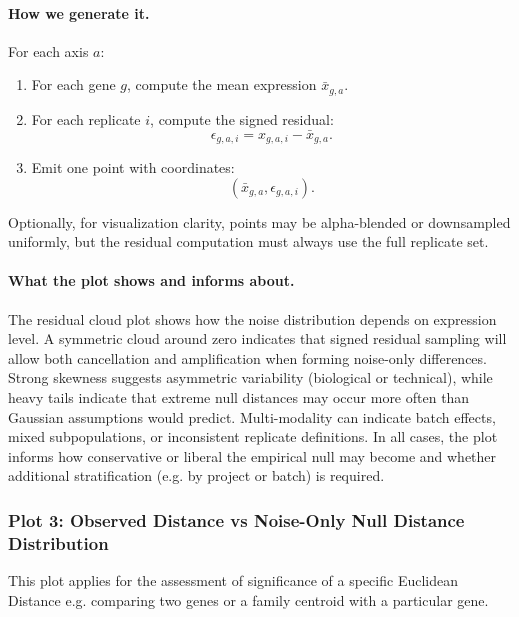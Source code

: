             \paragraph{How we generate it.}
            For each axis $a$:
            \begin{enumerate}
                \item For each gene $g$, compute the mean expression $\bar{x}_{g,a}$.
                \item For each replicate $i$, compute the signed residual:
                      \[
                          \epsilon_{g,a,i} = x_{g,a,i} - \bar{x}_{g,a}.
                      \]
                \item Emit one point with coordinates:
                      \[
                          (\bar{x}_{g,a}, \epsilon_{g,a,i}).
                      \]
            \end{enumerate}
            Optionally, for visualization clarity, points may be alpha-blended or downsampled uniformly, but the residual computation must always use the full replicate set.

            \paragraph{What the plot shows and informs about.}
            The residual cloud plot shows how the noise distribution depends on expression level. A symmetric cloud around zero indicates that signed residual sampling will allow both cancellation and amplification when forming noise-only differences. Strong skewness suggests asymmetric variability (biological or technical), while heavy tails indicate that extreme null distances may occur more often than Gaussian assumptions would predict. Multi-modality can indicate batch effects, mixed subpopulations, or inconsistent replicate definitions. In all cases, the plot informs how conservative or liberal the empirical null may become and whether additional stratification (e.g. by project or batch) is required.

        \subsubsection{Plot 3: Observed Distance vs Noise-Only Null Distance Distribution}\label{ssec:noise_vs_obs_distance_plot}

            This plot applies for the assessment of significance of a specific Euclidean Distance e.g. comparing two genes or a family centroid with a particular gene.

